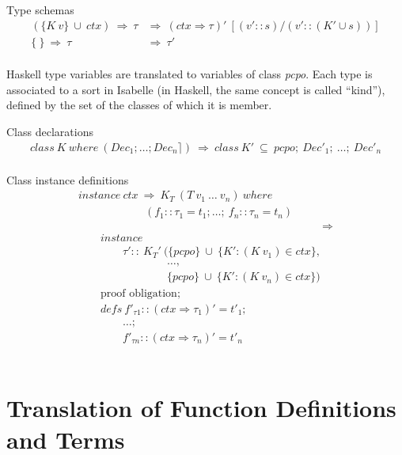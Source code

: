 \documentclass{llncs}
\begin{document}
\noindent Type schemas
$$\begin{array}{ll} 
  (\{K \ v\} \ \cup \ ctx) \ \Rightarrow \ \tau & \Longrightarrow 
  \ (ctx \Rightarrow \tau)'  
           \ [(v'::s) / (v'::({K'} \cup s))]  \\
  \{ \ \} \ \Rightarrow \ \tau & \Longrightarrow \ \tau'
\end{array}$$\\

Haskell type variables are translated to variables of class
\emph{pcpo}.  Each type is associated to a sort in Isabelle (in
Haskell, the same concept is called ``kind''), defined by the set of
the classes of which it is member.  
\medskip

\noindent Class declarations
$$\begin{array}{l} class \ K \ where \ (Dec_1; \ldots; Dec_n \rceil) \ 
  \Longrightarrow \ class \ K' \ \subseteq
  \ pcpo; \ Dec'_1; \ \ldots; \ Dec'_n \\
\end{array}$$
        
\noindent Class instance definitions
$$\begin{array}{l}
instance \ ctx \ \Rightarrow \ K_T \ (T \ v_1 \ \ldots \ v_n) \ where \\ 
  \qquad \qquad \qquad (f_1::\tau_1 = t_1; \ldots; \ f_n::\tau_n = t_n) \\
  \qquad \qquad \qquad \qquad \qquad \qquad \qquad 
  \qquad \qquad \qquad \qquad \Longrightarrow \\
  \qquad instance \\
  \qquad \qquad \tau' :: \ K_{T}' \ (\{pcpo\} \ \cup \ \{K':(K \ v_1)
  \in ctx\}, \\
   \qquad \qquad \qquad \quad \quad  \ldots, \\
  \qquad \qquad \qquad \quad \quad 
         \{pcpo\} \ \cup \ \{K':(K \ v_n) \in ctx\}) \\
  \qquad \mbox{proof \ obligation}; \\
  \qquad defs \ f'_{\tau 1} :: (ctx \Rightarrow \tau_1)' = t'_1; \\
  \qquad \qquad \ldots; \\
  \qquad \qquad f'_{\tau n} :: (ctx \Rightarrow \tau_n)' = t'_n
\end{array}$$\\





\section{Translation of Function Definitions and Terms}
\end{document}
